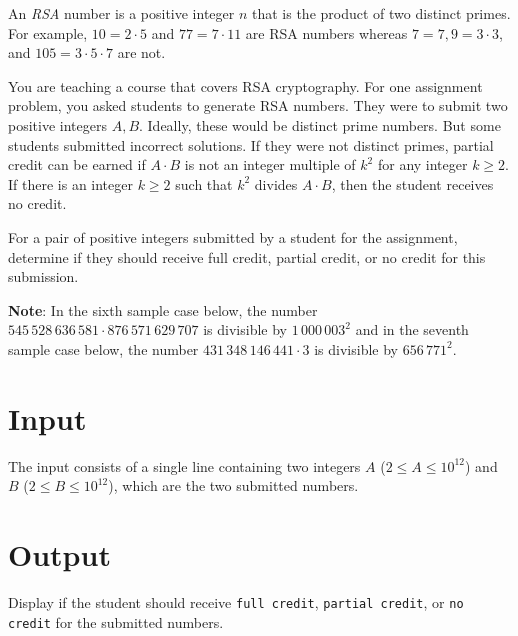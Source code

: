 
An {\em RSA} number is a positive integer $n$ that is the product
of two distinct primes. For example, $10 = 2 \cdot 5$ and $77 = 7 \cdot 11$
are RSA numbers whereas $7 = 7, 9 = 3 \cdot 3$, and $105 = 3 \cdot 5 \cdot 7$ are not.

You are teaching a course that covers RSA cryptography. For one assignment problem,
you asked students to generate RSA numbers. They were to submit two positive integers
$A, B$. Ideally, these would be distinct prime numbers. But some students submitted
incorrect solutions. If they were not distinct primes, partial credit can be earned
if $A \cdot B$ is not an integer multiple of $k^2$ for any integer $k \geq 2$. If
there is an integer $k \geq 2$ such that $k^2$ divides $A \cdot B$, then the student
receives no credit.

For a pair of positive integers submitted by a student for the assignment, determine
if they should receive full credit, partial credit, or no credit for this submission.

{\bf Note}: In the sixth sample case below, the number
$545\,528\,636\,581 \cdot 876\,571\,629\,707$ is divisible by $1\,000\,003^2$ and
in the seventh sample case below, the number $431\,348\,146\,441 \cdot 3$ is divisible
by $656\,771^2$.

\section*{Input}
The input consists of a single line containing two integers $A$ ($2 \leq A \leq 10^{12}$)
and $B$ ($2 \leq B \leq 10^{12}$), which are the two submitted numbers.

\section*{Output}
Display if the student should receive \texttt{full credit}, \texttt{partial credit}, or
\texttt{no credit} for the submitted numbers.

